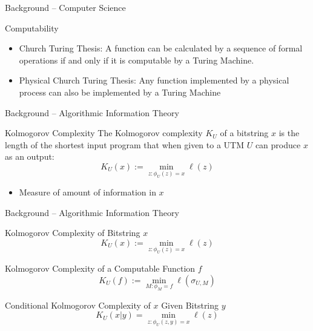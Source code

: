 \begin{frame}{Background -- Computer Science}
    \begin{block}{Computability}
    \begin{itemize}
        \item Church Turing Thesis: A function can be calculated by a sequence of formal operations if and only if it is computable by a Turing Machine.
       \item Physical Church Turing Thesis: Any function implemented by a physical process can also be implemented by a Turing Machine
    \end{itemize}
    \end{block}
\end{frame}

\begin{frame}{Background -- Algorithmic Information Theory}
\begin{block}{Kolmogorov Complexity}
The Kolmogorov complexity $K_U$ of a bitstring $x$ is the length of the shortest input program that when given to a UTM $U$ can produce $x$ as an output:
\begin{equation*}
    K_U(x) :=\min_{z:\phi_U(z) = x}\ell(z)
\end{equation*}
\begin{itemize}
    \item Measure of amount of information in $x$
\end{itemize}
\end{block}
\end{frame}

\begin{frame}{Background -- Algorithmic Information Theory}
    \begin{block}{Kolmogorov Complexity of Bitstring $x$}
    \begin{equation*}
        K_U(x) :=\min_{z:\phi_U(z) = x}\ell(z)
    \end{equation*}
    \end{block}
    \begin{block}{Kolmogorov Complexity of a Computable Function $f$}
    \begin{equation*}
        K_U(f) := \min_{M:\phi_M = f} \ell(\sigma_{U,M})
    \end{equation*}
    \end{block}
    \begin{block}{Conditional Kolmogorov Complexity of $x$ Given Bitstring $y$}
\begin{equation*}
    K_U(x|y) = \min_{z:\phi_U(z,y) = x} \ell(z)
\end{equation*}
\end{block}
\end{frame}

